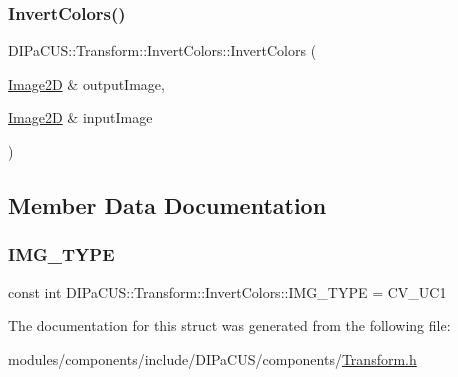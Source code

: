 \subsubsection{\texorpdfstring{Invert\+Colors()}{InvertColors()}}
{\footnotesize\ttfamily D\+I\+Pa\+C\+U\+S\+::\+Transform\+::\+Invert\+Colors\+::\+Invert\+Colors (\begin{DoxyParamCaption}\item[{\mbox{\hyperlink{structDIPaCUS_1_1Transform_1_1InvertColors_a0520b12f53327b6240a03bd9db4dfda7}{Image2D}} \&}]{output\+Image,  }\item[{\mbox{\hyperlink{structDIPaCUS_1_1Transform_1_1InvertColors_a0520b12f53327b6240a03bd9db4dfda7}{Image2D}} \&}]{input\+Image }\end{DoxyParamCaption})}



\subsection{Member Data Documentation}
\mbox{\label{structDIPaCUS_1_1Transform_1_1InvertColors_a98282fd7c160fa6aa172d4200d920c86}} 
\subsubsection{\texorpdfstring{I\+M\+G\+\_\+\+T\+Y\+PE}{IMG\_TYPE}}
{\footnotesize\ttfamily const int D\+I\+Pa\+C\+U\+S\+::\+Transform\+::\+Invert\+Colors\+::\+I\+M\+G\+\_\+\+T\+Y\+PE = C\+V\+\_\+U\+C1}



The documentation for this struct was generated from the following file\+:\begin{DoxyCompactItemize}
\item 
modules/components/include/\+D\+I\+Pa\+C\+U\+S/components/\mbox{\hyperlink{Transform_8h}{Transform.\+h}}\end{DoxyCompactItemize}
